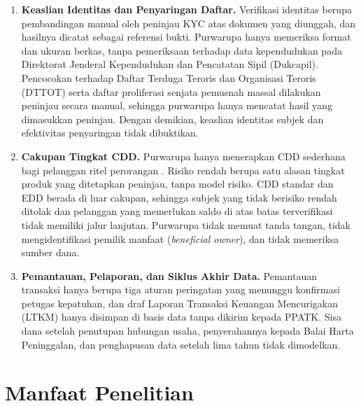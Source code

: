 \begin{enumerate}
	\item \textbf{Keaslian Identitas dan Penyaringan Daftar.} Verifikasi identitas berupa pembandingan manual oleh peninjau KYC atas dokumen yang diunggah, dan hasilnya dicatat sebagai referensi bukti. Purwarupa hanya memeriksa format dan ukuran berkas, tanpa pemeriksaan terhadap data kependudukan pada Direktorat Jenderal Kependudukan dan Pencatatan Sipil (Dukcapil). Pencocokan terhadap Daftar Terduga Teroris dan Organisasi Teroris (DTTOT) serta daftar proliferasi senjata pemusnah massal dilakukan peninjau secara manual, sehingga purwarupa hanya mencatat hasil yang dimasukkan peninjau. Dengan demikian, keaslian identitas subjek dan efektivitas penyaringan tidak dibuktikan.
	\item \textbf{Cakupan Tingkat CDD.} Purwarupa hanya menerapkan CDD sederhana bagi pelanggan ritel perorangan \cite{bi2024pbi10, bi2023pedoman}. Risiko rendah berupa satu alasan tingkat produk yang ditetapkan peninjau, tanpa model risiko. CDD standar dan EDD berada di luar cakupan, sehingga subjek yang tidak berisiko rendah ditolak dan pelanggan yang memerlukan saldo di atas batas terverifikasi tidak memiliki jalur lanjutan. Purwarupa tidak memuat tanda tangan, tidak mengidentifikasi pemilik manfaat (\textit{beneficial owner}), dan tidak memeriksa sumber dana.
	\item \textbf{Pemantauan, Pelaporan, dan Siklus Akhir Data.} Pemantauan transaksi hanya berupa tiga aturan peringatan yang menunggu konfirmasi petugas kepatuhan, dan draf Laporan Transaksi Keuangan Mencurigakan (LTKM) hanya disimpan di basis data tanpa dikirim kepada PPATK. Sisa dana setelah penutupan hubungan usaha, penyerahannya kepada Balai Harta Peninggalan, dan penghapusan data setelah lima tahun \cite[hlm.~40 dan 52]{bi2023pedoman} tidak dimodelkan.
\end{enumerate}

\section{Manfaat Penelitian}

